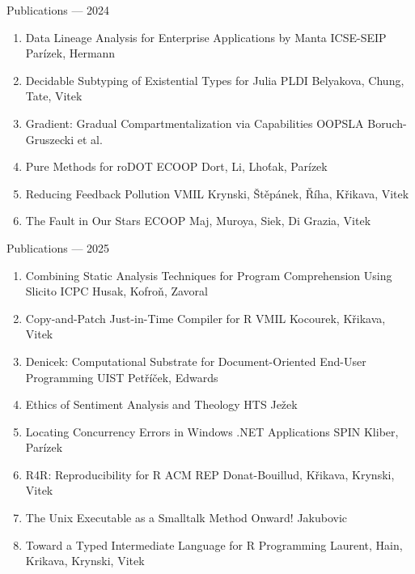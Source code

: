 \documentclass[aspectratio=169]{beamer}
\newcommand{\paper}[3]{\textcolor{papertitle}{#1} {\footnotesize\textcolor{venue}{#2}} {\footnotesize #3}}
\begin{document}
\begin{frame}{Publications --- 2024}
  \small
  \begin{enumerate}
    \item \paper{Data Lineage Analysis for Enterprise Applications by Manta}{ICSE-SEIP}{Par\'izek, Hermann}
    \item \paper{Decidable Subtyping of Existential Types for Julia}{PLDI}{Belyakova, Chung, Tate, Vitek}
    \item \paper{Gradient: Gradual Compartmentalization via Capabilities}{OOPSLA}{Boruch-Gruszecki et al.}
    \item \paper{Pure Methods for roDOT}{ECOOP}{Dort, Li, Lho\'tak, Par\'izek}
    \item \paper{Reducing Feedback Pollution}{VMIL}{Krynski, \v{S}t\v{e}p\'anek, \v{R}\'iha, K\v{r}ikava, Vitek}
    \item \paper{The Fault in Our Stars}{ECOOP}{Maj, Muroya, Siek, Di Grazia, Vitek}
  \end{enumerate}
\end{frame}

\begin{frame}{Publications --- 2025}
  \small
  \begin{enumerate}
    \item \paper{Combining Static Analysis Techniques for Program Comprehension Using Slicito}{ICPC}{Husak, Kofro\v{n}, Zavoral}
    \item \paper{Copy-and-Patch Just-in-Time Compiler for R}{VMIL}{Kocourek, K\v{r}ikava, Vitek}
    \item \paper{Denicek: Computational Substrate for Document-Oriented End-User Programming}{UIST}{Pet\v{r}\'i\v{c}ek, Edwards}
    \item \paper{Ethics of Sentiment Analysis and Theology}{HTS}{Je\v{z}ek}
    \item \paper{Locating Concurrency Errors in Windows .NET Applications}{SPIN}{Kliber, Par\'izek}
    \item \paper{R4R: Reproducibility for R}{ACM REP}{Donat-Bouillud, K\v{r}ikava, Krynski, Vitek}
    \item \paper{The Unix Executable as a Smalltalk Method}{Onward!}{Jakubovic}
    \item \paper{Toward a Typed Intermediate Language for R}{Programming}{Laurent, Hain, Krikava, Krynski, Vitek}
  \end{enumerate}
\end{frame}
\end{document}
